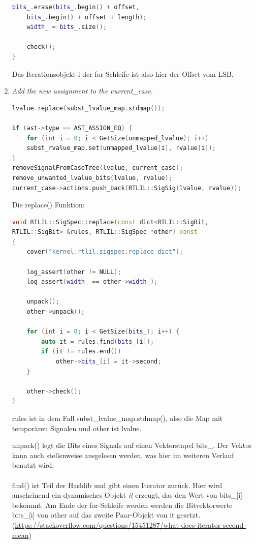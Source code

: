 \documentclass[11pt]{report}
\begin{document}
\begin{enumerate}
\begin{lstlisting}[language=C++]
	bits_.erase(bits_.begin() + offset, 
	bits_.begin() + offset + length);
	width_ = bits_.size();

	check();
}
\end{lstlisting}

Das Iterationsobjekt i der for-Schleife ist also hier der Offset vom LSB.


\item \textit{Add the new assignment to the current\_case.
}
\begin{lstlisting}[language=C++]
lvalue.replace(subst_lvalue_map.stdmap());

if (ast->type == AST_ASSIGN_EQ) {
	for (int i = 0; i < GetSize(unmapped_lvalue); i++)
	subst_rvalue_map.set(unmapped_lvalue[i], rvalue[i]);
}
removeSignalFromCaseTree(lvalue, current_case);
remove_unwanted_lvalue_bits(lvalue, rvalue);
current_case->actions.push_back(RTLIL::SigSig(lvalue, rvalue));
\end{lstlisting}

Die replace() Funktion:
\begin{lstlisting}[language=C++]
void RTLIL::SigSpec::replace(const dict<RTLIL::SigBit, 
RTLIL::SigBit> &rules, RTLIL::SigSpec *other) const
{
	cover("kernel.rtlil.sigspec.replace_dict");

	log_assert(other != NULL);
	log_assert(width_ == other->width_);

	unpack();
	other->unpack();

	for (int i = 0; i < GetSize(bits_); i++) {
		auto it = rules.find(bits_[i]);
		if (it != rules.end())
			other->bits_[i] = it->second;
	}

	other->check();
}
\end{lstlisting}

rules ist in dem Fall subst\_lvalue\_map.stdmap(), also die Map mit temporären Signalen und other ist lvalue.

unpack() legt die Bits eines Signals auf einen Vektorstapel bits\_. Der Vektor kann auch stellenweise ausgelesen werden, was hier im weiteren Verlauf benutzt wird.
\\
\\
find() ist Teil der Hashlib und gibt einen Iterator zurück. Hier wird anscheinend ein dynamisches Objekt \textit{it} erzeugt, das den Wert von bits\_[i] bekommt.
Am Ende der for-Schleife werden werden die Bitvektorwerte bits\_[i] von other auf das zweite Paar-Objekt von it gesetzt.\\
(\url{https://stackoverflow.com/questions/15451287/what-does-iterator-second-mean})

\end{enumerate}
\end{document}
